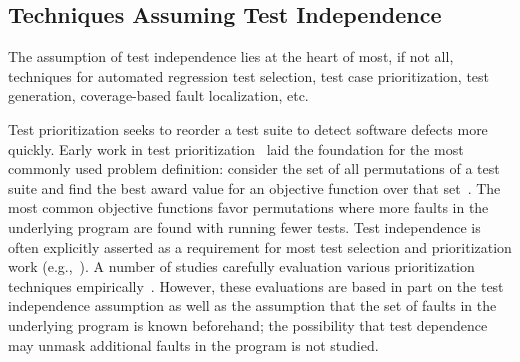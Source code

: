 

\subsection{Techniques Assuming Test Independence}

The assumption of test independence lies at the heart of most,
if not all, techniques for automated regression test selection,
test case prioritization, test generation, coverage-based
fault localization, etc. 


Test prioritization seeks to reorder a test suite to detect
software defects more quickly. 
Early work in test
prioritization~\cite{Wong:1997:SER:851010.856115,Rothermel:1999:TCP:519621.853398}
laid the foundation for the most commonly used problem definition:
consider the set of all permutations of a test suite and find the best
award value for an objective function over that
set~\cite{Elbaum:2000:PTC:347324.348910}.  The most common objective
functions favor permutations where more faults in the underlying
program  are found with running fewer tests.
Test independence is often explicitly asserted as a
requirement for most test selection and prioritization work (e.g.,~\cite[p.~1500]{Rummel:2005:TPR:1066677.1067016}).
A number of studies carefully evaluation various prioritization techniques
empirically~\cite[\emph{et
alia}]{Rothermel:1999:TCP:519621.853398,Do:2010:ETC:1907658.1908088}. 
However, these evaluations are based in part on the test independence
assumption as well as the assumption that the set of faults in the underlying
program is known beforehand; the possibility that test dependence may unmask additional faults in the program is not studied.

